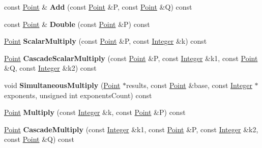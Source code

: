 \begin{DoxyCompactItemize}
\item 
\hypertarget{class_e_c_p_a61e8beae4530bbdd60cd9160a7eee42d}{
const \hyperlink{struct_e_c_p_point}{Point} \& {\bfseries Add} (const \hyperlink{struct_e_c_p_point}{Point} \&P, const \hyperlink{struct_e_c_p_point}{Point} \&Q) const }
\label{class_e_c_p_a61e8beae4530bbdd60cd9160a7eee42d}

\item 
\hypertarget{class_e_c_p_a33bddedc946ed3e889ad06d71af173d1}{
const \hyperlink{struct_e_c_p_point}{Point} \& {\bfseries Double} (const \hyperlink{struct_e_c_p_point}{Point} \&P) const }
\label{class_e_c_p_a33bddedc946ed3e889ad06d71af173d1}

\item 
\hypertarget{class_e_c_p_adfa8feab79acd8d68cb2428336ed2ba2}{
\hyperlink{struct_e_c_p_point}{Point} {\bfseries ScalarMultiply} (const \hyperlink{struct_e_c_p_point}{Point} \&P, const \hyperlink{class_integer}{Integer} \&k) const }
\label{class_e_c_p_adfa8feab79acd8d68cb2428336ed2ba2}

\item 
\hypertarget{class_e_c_p_ae21a76592bdc53167276598872264390}{
\hyperlink{struct_e_c_p_point}{Point} {\bfseries CascadeScalarMultiply} (const \hyperlink{struct_e_c_p_point}{Point} \&P, const \hyperlink{class_integer}{Integer} \&k1, const \hyperlink{struct_e_c_p_point}{Point} \&Q, const \hyperlink{class_integer}{Integer} \&k2) const }
\label{class_e_c_p_ae21a76592bdc53167276598872264390}

\item 
\hypertarget{class_e_c_p_ae03e8be5050fb0f67a6b63420512f8c2}{
void {\bfseries SimultaneousMultiply} (\hyperlink{struct_e_c_p_point}{Point} $\ast$results, const \hyperlink{struct_e_c_p_point}{Point} \&base, const \hyperlink{class_integer}{Integer} $\ast$exponents, unsigned int exponentsCount) const }
\label{class_e_c_p_ae03e8be5050fb0f67a6b63420512f8c2}

\item 
\hypertarget{class_e_c_p_a81862b8619979835884f0239012e2ce9}{
\hyperlink{struct_e_c_p_point}{Point} {\bfseries Multiply} (const \hyperlink{class_integer}{Integer} \&k, const \hyperlink{struct_e_c_p_point}{Point} \&P) const }
\label{class_e_c_p_a81862b8619979835884f0239012e2ce9}

\item 
\hypertarget{class_e_c_p_ade7d41c2b0ce5941c69b071081c2cb06}{
\hyperlink{struct_e_c_p_point}{Point} {\bfseries CascadeMultiply} (const \hyperlink{class_integer}{Integer} \&k1, const \hyperlink{struct_e_c_p_point}{Point} \&P, const \hyperlink{class_integer}{Integer} \&k2, const \hyperlink{struct_e_c_p_point}{Point} \&Q) const }
\label{class_e_c_p_ade7d41c2b0ce5941c69b071081c2cb06}


\end{DoxyCompactItemize}
